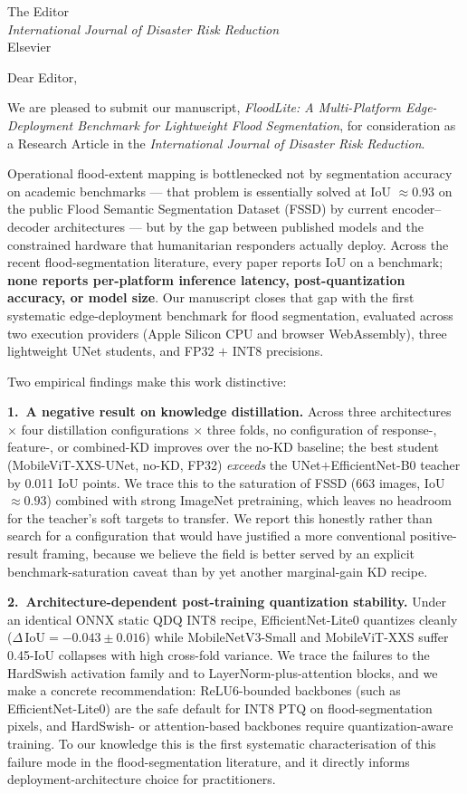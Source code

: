 \documentclass[11pt]{letter}
\begin{document}
\begin{letter}{The Editor\\\emph{International Journal of Disaster Risk Reduction}\\Elsevier}

\opening{Dear Editor,}

We are pleased to submit our manuscript, \emph{FloodLite: A Multi-Platform Edge-Deployment Benchmark for Lightweight Flood Segmentation}, for consideration as a Research Article in the \emph{International Journal of Disaster Risk Reduction}.

Operational flood-extent mapping is bottlenecked not by segmentation accuracy on academic benchmarks --- that problem is essentially solved at IoU $\approx 0.93$ on the public Flood Semantic Segmentation Dataset (FSSD) by current encoder--decoder architectures --- but by the gap between published models and the constrained hardware that humanitarian responders actually deploy. Across the recent flood-segmentation literature, every paper reports IoU on a benchmark; \textbf{none reports per-platform inference latency, post-quantization accuracy, or model size}. Our manuscript closes that gap with the first systematic edge-deployment benchmark for flood segmentation, evaluated across two execution providers (Apple Silicon CPU and browser WebAssembly), three lightweight UNet students, and FP32 $+$ INT8 precisions.

Two empirical findings make this work distinctive:

\textbf{1.~A negative result on knowledge distillation.} Across three architectures $\times$ four distillation configurations $\times$ three folds, no configuration of response-, feature-, or combined-KD improves over the no-KD baseline; the best student (MobileViT-XXS-UNet, no-KD, FP32) \emph{exceeds} the UNet$+$EfficientNet-B0 teacher by 0.011 IoU points. We trace this to the saturation of FSSD (663 images, IoU $\approx 0.93$) combined with strong ImageNet pretraining, which leaves no headroom for the teacher's soft targets to transfer. We report this honestly rather than search for a configuration that would have justified a more conventional positive-result framing, because we believe the field is better served by an explicit benchmark-saturation caveat than by yet another marginal-gain KD recipe.

\textbf{2.~Architecture-dependent post-training quantization stability.} Under an identical ONNX static QDQ INT8 recipe, EfficientNet-Lite0 quantizes cleanly ($\Delta\,\mathrm{IoU} = -0.043 \pm 0.016$) while MobileNetV3-Small and MobileViT-XXS suffer 0.45-IoU collapses with high cross-fold variance. We trace the failures to the HardSwish activation family and to LayerNorm-plus-attention blocks, and we make a concrete recommendation: ReLU6-bounded backbones (such as EfficientNet-Lite0) are the safe default for INT8 PTQ on flood-segmentation pixels, and HardSwish- or attention-based backbones require quantization-aware training. To our knowledge this is the first systematic characterisation of this failure mode in the flood-segmentation literature, and it directly informs deployment-architecture choice for practitioners.


\end{letter}
\end{document}
